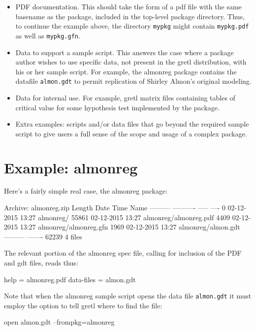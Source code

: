 \documentclass[oneside]{book}
\begin{document}
\begin{itemize}
\item PDF documentation. This should take the form of a pdf file with
  the same basename as the package, included in the top-level package
  directory. Thus, to continue the example above, the directory
  \texttt{mypkg} might contain \texttt{mypkg.pdf} as well as
  \texttt{mypkg.gfn}.
\item Data to support a sample script. This answers the case where a
  package author wishes to use specific data, not present in the gretl
  distribution, with his or her sample script. For example, the
  \textsf{almonreg} package contains the datafile \texttt{almon.gdt}
  to permit replication of Shirley Almon's original modeling.
\item Data for internal use. For example, gretl matrix files
  containing tables of critical value for some hypothesis test
  implemented by the package.
\item Extra examples: scripts and/or data files that go beyond the
  required sample script to give users a full sense of the scope and
  usage of a complex package.
\end{itemize}

\section{Example: \textsf{almonreg}}

Here's a fairly simple real case, the \textsf{almonreg} package:
%
\begin{code}
Archive:  almonreg.zip
  Length      Date    Time    Name
---------  ---------- -----   ----
        0  02-12-2015 13:27   almonreg/
    55861  02-12-2015 13:27   almonreg/almonreg.pdf
     4409  02-12-2015 13:27   almonreg/almonreg.gfn
     1969  02-12-2015 13:27   almonreg/almon.gdt
---------                     -------
    62239                     4 files
\end{code}

The relevant portion of the \textsf{almonreg} spec file, calling for
inclusion of the PDF and gdt files, reads thus:
%
\begin{code}
help = almonreg.pdf
data-files = almon.gdt
\end{code}

Note that when the \textsf{almonreg} sample script opens the data file
\texttt{almon.gdt} it must employ the  option to tell
gretl where to find the file:
%
\begin{code}
open almon.gdt --frompkg=almonreg
\end{code}
\end{document}
